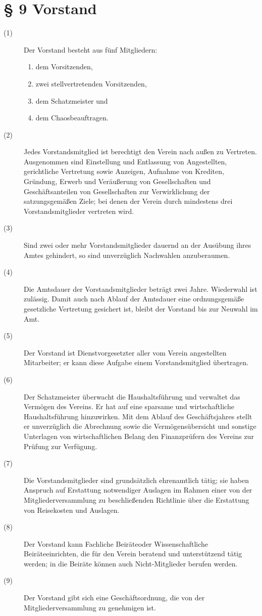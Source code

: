 \documentclass[12pt,paper=a4,ngerman]{scrreprt}
\begin{document}
\section{\S{} 9 Vorstand}
\begin{description}
	\item[(1)] Der Vorstand besteht aus fünf Mitgliedern:
	\begin{enumerate}
		\item dem Vorsitzenden,
		\item zwei stellvertretenden Vorsitzenden,
		\item dem Schatzmeister und
		\item dem Chaosbeauftragen.
	\end{enumerate}
	\item[(2)] Jedes Vorstandsmitglied ist berechtigt den Verein nach außen zu Vertreten. Ausgenommen sind Einstellung und Entlassung von Angestellten, gerichtliche Vertretung sowie Anzeigen, Aufnahme von Krediten, Gründung, Erwerb und Veräußerung von Gesellschaften und Geschäftsanteilen von Gesellschaften zur Verwirklichung der satzungsgemäßen Ziele; bei denen der Verein durch mindestens drei Vorstandsmitglieder vertreten wird.
	\item[(3)] Sind zwei oder mehr Vorstandsmitglieder dauernd an der Ausübung ihres Amtes gehindert, so sind unverzüglich Nachwahlen anzuberaumen.
	\item[(4)] Die Amtsdauer der Vorstandsmitglieder beträgt zwei Jahre. Wiederwahl ist zulässig. Damit auch nach Ablauf der Amtsdauer eine ordnungsgemäße gesetzliche Vertretung gesichert ist, bleibt der Vorstand bis zur Neuwahl im Amt.
	\item[(5)] Der Vorstand ist Dienstvorgesetzter aller vom Verein angestellten Mitarbeiter; er kann diese Aufgabe einem Vorstandsmitglied übertragen.
	\item[(6)] Der Schatzmeister überwacht die Haushaltsführung und verwaltet das Vermögen des Vereins. Er hat auf eine sparsame und wirtschaftliche Haushaltsführung hinzuwirken. Mit dem Ablauf des Geschäftsjahres stellt er unverzüglich die Abrechnung sowie die Vermögensübersicht und sonstige Unterlagen von wirtschaftlichen Belang den Finanzprüfern des Vereins zur Prüfung zur Verfügung.
	\item[(7)] Die Vorstandsmitglieder sind grundsätzlich ehrenamtlich tätig; sie haben Anspruch auf Erstattung notwendiger Auslagen im Rahmen einer von der Mitgliederversammlung zu beschließenden Richtlinie über die Erstattung von Reisekosten und Auslagen.
	\item[(8)] Der Vorstand kann \grqq Fachliche Beiräte\grqq oder \grqq Wissenschaftliche Beiräte\grqq einrichten, die für den Verein beratend und unterstützend tätig werden; in die Beiräte können auch Nicht-Mitglieder berufen werden.
	\item[(9)] Der Vorstand gibt sich eine Geschäftsordnung, die von der Mitgliederversammlung zu genehmigen ist.
\end{description}
\end{document}
